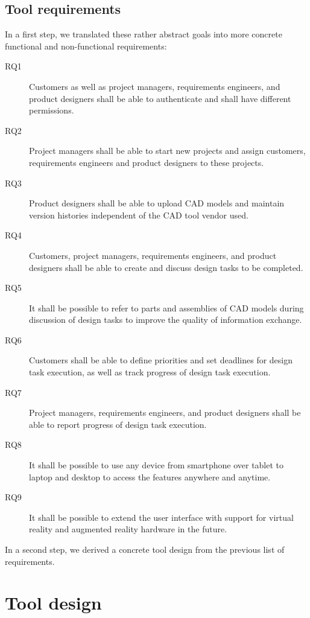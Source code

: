     \subsection*{Tool requirements}
    In a first step, we translated these rather abstract goals into more concrete functional and non-functional requirements:
    \begin{description}
        \item[RQ1] Customers as well as project managers, requirements engineers, and product designers shall be able to authenticate and shall have different permissions. 
        \item[RQ2] Project managers shall be able to start new projects and assign customers, requirements engineers and product designers to these projects.
        \item[RQ3] Product designers shall be able to upload CAD models and maintain version histories independent of the CAD tool vendor used.
        \item[RQ4] Customers, project managers, requirements engineers, and product designers shall be able to create and discuss design tasks to be completed.
        \item[RQ5] It shall be possible to refer to parts and assemblies of CAD models during discussion of design tasks to improve the quality of information exchange.
        \item[RQ6] Customers shall be able to define priorities and set deadlines for design task execution, as well as track progress of design task execution.
        \item[RQ7] Project managers, requirements engineers, and product designers shall be able to report progress of design task execution.
        \item[RQ8] It shall be possible to use any device from smartphone over tablet to laptop and desktop to access the features anywhere and anytime.
        \item[RQ9] It shall be possible to extend the user interface with support for virtual reality and augmented reality hardware in the future.
    \end{description}
    In a second step, we derived a concrete tool design from the previous list of requirements.

\section{Tool design}
    \label{sec:contribution}

